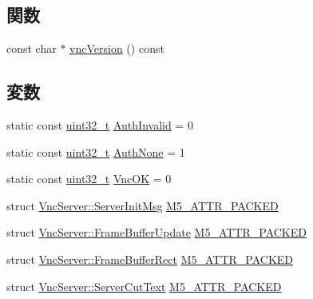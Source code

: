 \subsection*{関数}
\begin{DoxyCompactItemize}
\item 
const char $\ast$ \hyperlink{group__VncConstants_ga36bab5b0163b272b816361d6214c3f14}{vncVersion} () const 
\end{DoxyCompactItemize}
\subsection*{変数}
\begin{DoxyCompactItemize}
\item 
static const \hyperlink{Type_8hh_a435d1572bf3f880d55459d9805097f62}{uint32\_\-t} \hyperlink{group__VncConstants_ga0adb6517a8a2c8403f7aff85bad3dfa5}{AuthInvalid} = 0
\item 
static const \hyperlink{Type_8hh_a435d1572bf3f880d55459d9805097f62}{uint32\_\-t} \hyperlink{group__VncConstants_gabc058a28bda6e015dbafe8bbfbddb821}{AuthNone} = 1
\item 
static const \hyperlink{Type_8hh_a435d1572bf3f880d55459d9805097f62}{uint32\_\-t} \hyperlink{group__VncConstants_ga6d4127ee4f24603d9a0c7e3257b04ca3}{VncOK} = 0
\item 
struct \hyperlink{structVncServer_1_1ServerInitMsg}{VncServer::ServerInitMsg} \hyperlink{group__VncConstants_ga2f0a8a1f1c40593e1e01ce4b8087d792}{M5\_\-ATTR\_\-PACKED}
\item 
struct \hyperlink{structVncServer_1_1FrameBufferUpdate}{VncServer::FrameBufferUpdate} \hyperlink{group__VncConstants_ga357314e013d6289c7d085fadd56a290c}{M5\_\-ATTR\_\-PACKED}
\item 
struct \hyperlink{structVncServer_1_1FrameBufferRect}{VncServer::FrameBufferRect} \hyperlink{group__VncConstants_gab34a91a8552f4b2f7e2806b835f39780}{M5\_\-ATTR\_\-PACKED}
\item 
struct \hyperlink{structVncServer_1_1ServerCutText}{VncServer::ServerCutText} \hyperlink{group__VncConstants_gac782a3823c0bb07395a234047394d59e}{M5\_\-ATTR\_\-PACKED}
\end{DoxyCompactItemize}


